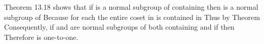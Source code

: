 \documentclass[11pt,oneside]{article}
\begin{document}
\begin{BookBody}
 Theorem 13.18 shows that if  is a normal subgroup of  containing  then  \BookInline{\gamma [L]} is a normal subgroup of  Because  for each  the entire coset  in  is contained in  Thus by Theorem  Consequently, if  and  are normal subgroups of  both containing  and if  then  Therefore \BookInline{\phi } is one-to-one.

\end{BookBody}

\BookNarrativetrue
\end{document}
